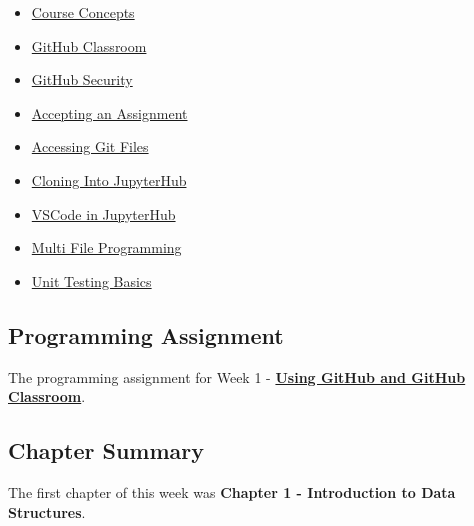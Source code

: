 \begin{itemize}
    \item \href{https://www.youtube.com/watch?v=l3e6UsF1RdQ}{Course Concepts}
    \item \href{https://www.youtube.com/watch?v=hu81oFq0nA8}{GitHub Classroom}
    \item \href{https://www.youtube.com/watch?v=7_x86HeoglQ&t=178s}{GitHub Security}
    \item \href{https://www.youtube.com/watch?v=b0Ystl84XYY}{Accepting an Assignment}
    \item \href{https://applied.cs.colorado.edu/mod/page/view.php?id=45856}{Accessing Git Files}
    \item \href{https://www.youtube.com/watch?v=M293X5ssks4}{Cloning Into JupyterHub}
    \item \href{https://www.youtube.com/watch?v=dptdfci_Zn0}{VSCode in JupyterHub}
    \item \href{https://www.youtube.com/watch?v=jchWSvAdadE}{Multi File Programming}
    \item \href{https://www.youtube.com/watch?v=tsVh8mG2tM0}{Unit Testing Basics}
\end{itemize}

\subsection{Programming Assignment}

The programming assignment for Week 1 - \href{https://github.com/QuantumCompiler/CU/tree/main/CSPB%202270%20-%20Data%20Structures/CSPB%202270%20-%20Programming%20Assignments/CSPB%202270%20-%20Assignment%200%20-%20GitHub}{\textbf{Using GitHub and GitHub Classroom}}.

\subsection{Chapter Summary}

The first chapter of this week was \textbf{Chapter 1 - Introduction to Data Structures}.

